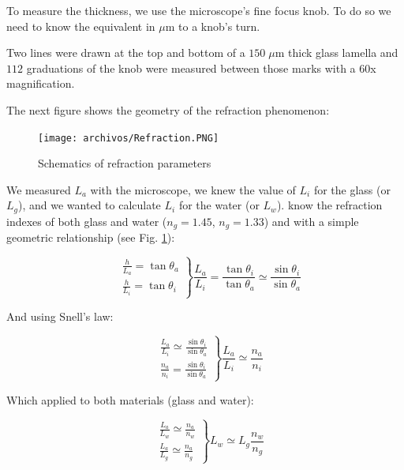 To measure the thickness, we use the microscope's fine focus knob. To do so we need to know the equivalent in $\mu \textrm{m}$ to a knob's turn. 

Two lines were drawn at the top and bottom of a $150 \; \mu \textrm{m}$ thick glass lamella and $112$ graduations of the knob were measured between those marks with a 60x magnification. 

The next figure shows the geometry of the refraction phenomenon:

\begin{figure}[H]
	\centering
	\texttt{[image: archivos/Refraction.PNG]}
	\caption{Schematics of refraction parameters}
	\label{refraction}
\end{figure}

We measured $L_a$ with the microscope, we knew the value of $L_i$ for the glass (or $L_g$), and we wanted to calculate $L_i$ for the water (or $L_w$). know the refraction indexes of both glass and water ($n_g = 1.45$,  $n_g = 1.33$) and with a simple geometric relationship (see Fig. \ref{refraction}):

\begin{equation}
\left.
\begin{aligned}
& \frac{h}{L_a} = \tan \theta_a \\
& \frac{h}{L_i} = \tan \theta_i
\end{aligned}
\right\}
\frac{L_a}{L_i} = \frac{\tan \theta_i}{\tan \theta_a} \simeq \frac{\sin \theta_i}{\sin \theta_a}
\end{equation}

And using Snell's law:

\begin{equation}
\left.
\begin{aligned}
& \frac{L_a}{L_i} \simeq \frac{\sin \theta_i}{\sin \theta_a} \\
& \frac{n_a}{n_i} = \frac{\sin \theta_i}{\sin \theta_a}
\end{aligned}
\right\}
\frac{L_a}{L_i} \simeq \frac{n_a}{n_i} 
\end{equation}

Which applied to both materials (glass and water):

\begin{equation}
\left.
\begin{aligned}
& \frac{L_a}{L_w} \simeq \frac{n_a}{n_w} \\
& \frac{L_a}{L_g} \simeq \frac{n_a}{n_g} 
\end{aligned}
\right\}
L_w \simeq L_g\frac{n_w}{n_g} 
\end{equation}

